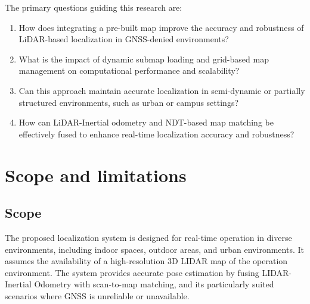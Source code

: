 The primary questions guiding this research are:
\begin{enumerate}
    \item How does integrating a pre-built map improve the accuracy and robustness of LiDAR-based localization in GNSS-denied environments?
    \item What is the impact of dynamic submap loading and grid-based map management on computational performance and scalability?
    \item Can this approach maintain accurate localization in semi-dynamic or partially structured environments, such as urban or campus settings?
    \item How can LiDAR-Inertial odometry and NDT-based map matching be effectively fused to enhance real-time localization accuracy and robustness?
\end{enumerate}
\section{Scope and limitations}
\subsection{Scope}
The proposed localization system is designed for real-time operation in diverse environments, including indoor spaces, outdoor areas, and urban environments. It assumes the availability of a high-resolution 3D LIDAR map of the operation environment. The system provides accurate pose estimation by fusing LIDAR-Inertial Odometry with scan-to-map matching, and its particularly suited scenarios where GNSS is unreliable or unavailable.
